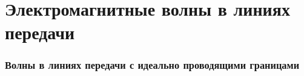 \documentclass[a4paper,14pt]{extarticle}
\theoremstyle{definition}
\begin{document}

\newpage
\tableofcontents 
\newpage

\part{Электромагнитные волны в линиях передачи}

\section{Волны в линиях передачи с идеально проводящими границами}


\newpage
\newpage
\newpage
\end{document}
